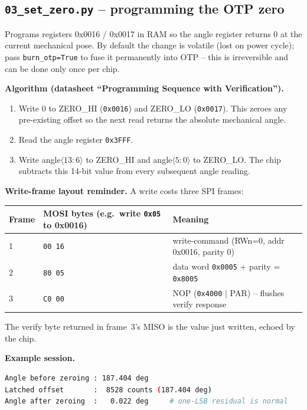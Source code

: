 \documentclass[11pt,a4paper]{article}
\begin{document}
\subsection{\texttt{03\_set\_zero.py} -- programming the OTP zero}
Programs registers 0x0016 / 0x0017 in RAM so the angle register
returns 0 at the current mechanical pose.  By default the change is
volatile (lost on power cycle); pass \texttt{burn\_otp=True} to fuse
it permanently into OTP -- this is irreversible and can be done only
once per chip.

\textbf{Algorithm (datasheet ``Programming Sequence with
Verification'').}
\begin{enumerate}
  \item Write 0 to ZERO\_HI (\texttt{0x0016}) and ZERO\_LO
        (\texttt{0x0017}).  This zeroes any pre-existing offset so the
        next read returns the absolute mechanical angle.
  \item Read the angle register \texttt{0x3FFF}.
  \item Write angle$\langle 13\!:\!6\rangle$ to ZERO\_HI and
        angle$\langle 5\!:\!0\rangle$ to ZERO\_LO.  The chip
        subtracts this 14-bit value from every subsequent angle
        reading.
\end{enumerate}

\textbf{Write-frame layout reminder.}  A write costs three SPI frames:
\begin{center}\small
\begin{tabular}{lll}
\toprule
Frame & MOSI bytes (e.g.\ write \texttt{0x05} to 0x0016) & Meaning \\
\midrule
1 & \texttt{00 16}  & write-command (RWn=0, addr 0x0016, parity 0)\\
2 & \texttt{80 05}  & data word \texttt{0x0005} + parity = \texttt{0x8005} \\
3 & \texttt{C0 00}  & NOP (\texttt{0x4000} | PAR) -- flushes verify response \\
\bottomrule
\end{tabular}
\end{center}
The verify byte returned in frame~3's MISO is the value just written,
echoed by the chip.

\textbf{Example session.}
\begin{lstlisting}[language=bash]
Angle before zeroing : 187.404 deg
Latched offset       :  8528 counts (187.404 deg)
Angle after zeroing  :   0.022 deg     # one-LSB residual is normal
\end{lstlisting}
\end{document}
